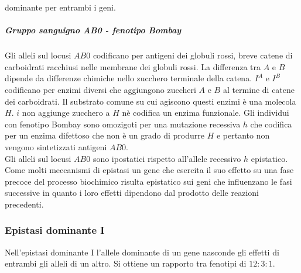 dominante per entrambi i geni.
\subparagraph{Gruppo sanguigno \emph{AB0} - fenotipo Bombay}
Gli alleli sul locusi $AB0$ codificano per antigeni dei globuli rossi, breve catene di carboidrati racchiusi nelle membrane dei globuli rossi. La differenza tra $A$ e $B$ dipende da differenze chimiche
nello zucchero terminale della catena. $I^A$ e $I^B$ codificano per enzimi diversi che aggiungono zuccheri $A$ e $B$ al termine di catene dei carboidrati. Il substrato comune su cui agiscono questi
enzimi \`e una molecola $H$. $i$ non aggiunge zucchero a $H$ n\`e codifica un enzima funzionale. Gli individui con fenotipo Bombay sono omozigoti per una mutazione recessiva $h$ che codifica per un 
enzima difettoso che non \`e un grado di produrre $H$ e pertanto non vengono sintetizzati antigeni $AB0$. \\
Gli alleli sul locusi $AB0$ sono ipostatici rispetto all'allele recessivo $h$ epistatico. Come molti meccanismi di epistasi un gene che esercita il suo effetto su una fase precoce del processo biochimico
risulta epistatico sui geni che influenzano le fasi successive in quanto i loro effetti dipendono dal prodotto delle reazioni precedenti. 
\subsubsection{Epistasi dominante I}
Nell'epistasi dominante I l'allele dominante di un gene nasconde gli effetti di entrambi gli alleli di un altro. Si ottiene un rapporto tra fenotipi di $12:3:1$.

